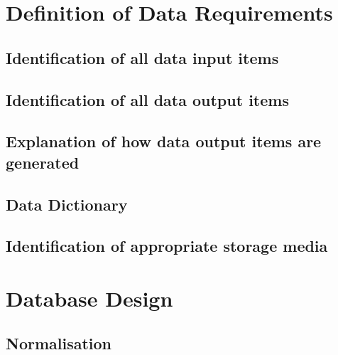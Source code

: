 \section{Definition of Data Requirements}

\subsection{Identification of all data input items}

\subsection{Identification of all data output items}

\subsection{Explanation of how data output items are generated}

\subsection{Data Dictionary}

\subsection{Identification of appropriate storage media}

\section{Database Design}

\subsection{Normalisation}

\newpage

